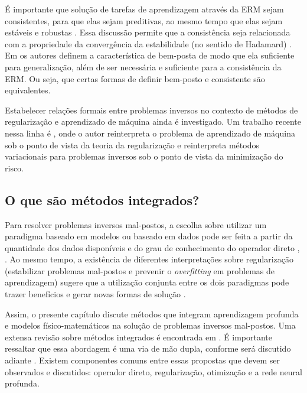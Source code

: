 É importante que solução de tarefas de aprendizagem através da ERM sejam consistentes, para que elas sejam preditivas, ao mesmo tempo que elas sejam estáveis e robustas \cite{Mukherjee2006}. Essa discussão permite que a consistência seja relacionada com a propriedade da convergência da estabilidade (no sentido de Hadamard) \cite{devito2005}. Em \cite{Mukherjee2006} os autores definem a característica de bem-posta de modo que ela suficiente para generalização, além de ser necessária e suficiente para a consistência da ERM. Ou seja, que certas formas de definir bem-posto e consistente são equivalentes. 

Estabelecer relações formais entre problemas inversos no contexto de métodos de regularização e aprendizado de máquina ainda é investigado. Um trabalho recente nessa linha é  \cite{Burger2021}, onde o autor reinterpreta o problema de aprendizado de máquina sob o ponto de vista da teoria da regularização e reinterpreta métodos variacionais para problemas inversos sob o ponto de vista da minimização do risco.  





\subsection{O que são métodos integrados?}

Para resolver problemas inversos mal-postos, a escolha sobre utilizar um paradigma baseado em modelos ou baseado em dados pode ser feita a partir da quantidade dos dados disponíveis e do grau de conhecimento do operador direto \cite[Figura 1.5]{inman2005damage}, \cite{Ongie2020}. Ao mesmo tempo, a existência de diferentes interpretações sobre regularização (estabilizar problemas mal-postos e prevenir o \textit{overfitting} em problemas de aprendizagem) sugere que a utilização conjunta entre os dois paradigmas pode trazer benefícios e gerar novas formas de solução \cite{Adler2021}. 

Assim, o presente capítulo discute métodos que integram aprendizagem profunda e modelos físico-matemáticos na solução de problemas inversos mal-postos. Uma extensa revisão sobre métodos integrados é encontrada em \cite{Arridge2019}. É importante ressaltar que essa abordagem é uma via de mão dupla, conforme será discutido adiante \cite{Arridge2019, Kording2018}. Existem componentes comuns entre essas propostas que devem ser observados e discutidos: operador direto, regularização, otimização e a rede neural profunda. 
 
